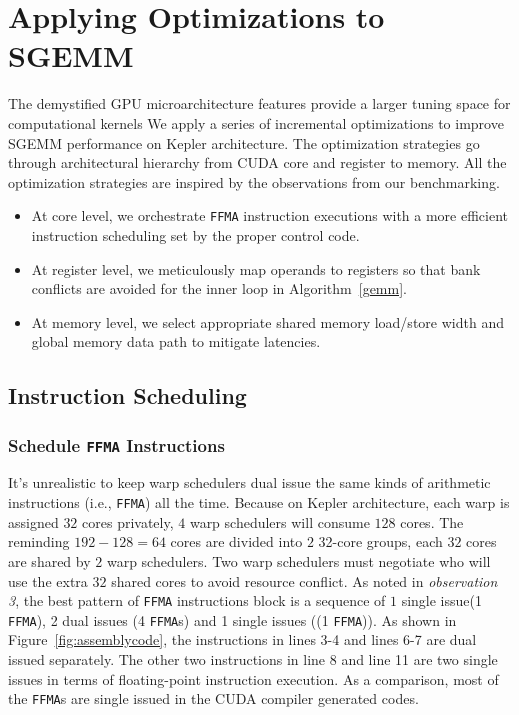 \section{Applying Optimizations to SGEMM}
\label{sec:optimization}


The demystified GPU microarchitecture features provide a larger tuning space for computational kernels 
We apply
a series of incremental optimizations to improve SGEMM performance on Kepler architecture. The optimization strategies
go through architectural hierarchy from CUDA core and register to memory. All the optimization strategies are inspired by the observations from our benchmarking.
\begin{itemize}
\item At core level, we orchestrate {\tt FFMA} instruction executions with a more efficient instruction scheduling set by the proper control code.
\item At register level, we meticulously map operands to registers so that bank conflicts are avoided for the inner loop in Algorithm~\ref{gemm}.
\item At memory level, we select appropriate shared memory load/store width and global memory data path to mitigate
latencies.
\end{itemize}

\subsection{Instruction Scheduling}
\subsubsection{Schedule {\tt FFMA} Instructions}
It's unrealistic to keep warp schedulers dual issue the same kinds of arithmetic instructions (i.e., {\tt FFMA}) all
the time. Because on Kepler architecture, each warp is assigned $32$ cores privately, $4$ warp schedulers will consume
$128$ cores. The reminding $192-128=64$ cores are divided into $2$ 32-core groups, each $32$ cores
are shared by $2$ warp schedulers. Two warp schedulers must negotiate who will use the extra $32$ shared cores to avoid
resource conflict.
As noted in {\em observation 3}, the best pattern of {\tt FFMA} instructions block is a sequence of $1$ single issue(1
{\tt FFMA}), 2 dual issues (4 {\tt FFMA}s) and 1 single issues ((1 {\tt FFMA})). As shown in
Figure~\ref{fig:assemblycode}, the instructions in lines 3-4 and lines 6-7 are dual issued separately.
The other two instructions in line 8 and line 11 are two single issues in terms of floating-point instruction
execution.
As a comparison, most of the {\tt FFMA}s are single issued in the CUDA compiler generated codes.


